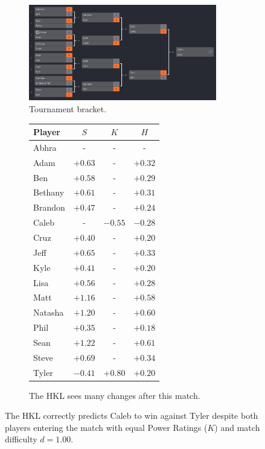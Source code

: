 \documentclass[letterpaper, 10 pt, conference]{ieeeconf}  %
\begin{document}
\begin{figure}
        \begin{subfigure}[ht]{0.5\textwidth}
                \centering
                \includegraphics[width=0.9\textwidth]{fig/singles-bracket_6.png}
                \caption{Tournament bracket.}
        \end{subfigure}
        \begin{subfigure}[hb]{0.4\textwidth}
                \footnotesize
                \centering
                \begin{tabular}{lccc}
                        Player	&	$S$	&	$K$	&	$H$	\\
                        \midrule							
                        Abhra	&	-	&	-	&	-	\\
                        Adam	&	$+0.63$	&	-	&	$+0.32$	\\
                        Ben	&	$+0.58$	&	-	&	$+0.29$	\\
                        Bethany	&	$+0.61$	&	-	&	$+0.31$	\\
                        Brandon	&	$+0.47$	&	-	&	$+0.24$	\\
                        Caleb	&	-	&	$-0.55$	&	$-0.28$	\\
                        Cruz	&	$+0.40$	&	-	&	$+0.20$	\\
                        Jeff	&	$+0.65$	&	-	&	$+0.33$	\\
                        Kyle	&	$+0.41$	&	-	&	$+0.20$	\\
                        Lisa	&	$+0.56$	&	-	&	$+0.28$	\\
                        Matt	&	$+1.16$	&	-	&	$+0.58$	\\
                        Natasha	&	$+1.20$	&	-	&	$+0.60$	\\
                        Phil	&	$+0.35$	&	-	&	$+0.18$	\\
                        Sean	&	$+1.22$	&	-	&	$+0.61$	\\
                        Steve	&	$+0.69$	&	-	&	$+0.34$	\\
                        Tyler	&	$-0.41$	&	$+0.80$	&	$+0.20$	\\
                \end{tabular}
                \caption{The HKL sees many changes after this match.}
        \end{subfigure}
        \caption{The HKL correctly predicts Caleb to win against Tyler despite
                 both players entering the match with equal Power Ratings ($K$)
                 and match difficulty $d=1.00$.}
\end{figure}
\end{document}
